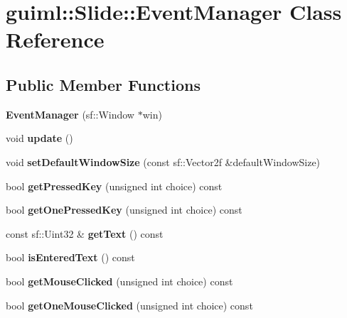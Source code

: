 \section{guiml\-:\-:Slide\-:\-:Event\-Manager Class Reference}
\label{classguiml_1_1_slide_1_1_event_manager}
\subsection*{Public Member Functions}
\begin{DoxyCompactItemize}
\item 
{\bfseries Event\-Manager} (sf\-::\-Window $\ast$win)\label{classguiml_1_1_slide_1_1_event_manager_a2312e0afea0595bfe5313506417b1020}

\item 
void {\bfseries update} ()\label{classguiml_1_1_slide_1_1_event_manager_a26ff440020a0bf66759d27147cdc0910}

\item 
void {\bfseries set\-Default\-Window\-Size} (const sf\-::\-Vector2f \&default\-Window\-Size)\label{classguiml_1_1_slide_1_1_event_manager_a36ce2699e385199a00e9ae84fb98f3af}

\item 
bool {\bfseries get\-Pressed\-Key} (unsigned int choice) const \label{classguiml_1_1_slide_1_1_event_manager_ab3c83fb89eba4f54a716ef9e1ed88a50}

\item 
bool {\bfseries get\-One\-Pressed\-Key} (unsigned int choice) const \label{classguiml_1_1_slide_1_1_event_manager_a0af69bffc6dfb52568b0737d1b29e41f}

\item 
const sf\-::\-Uint32 \& {\bfseries get\-Text} () const \label{classguiml_1_1_slide_1_1_event_manager_a7a8fde225b3f218509023f19cf7d44be}

\item 
bool {\bfseries is\-Entered\-Text} () const \label{classguiml_1_1_slide_1_1_event_manager_a9f140592c6c835cf31dd7ba3e9335d5d}

\item 
bool {\bfseries get\-Mouse\-Clicked} (unsigned int choice) const \label{classguiml_1_1_slide_1_1_event_manager_a6e674b83521874b06f1a15bcff739c8b}

\item 
bool {\bfseries get\-One\-Mouse\-Clicked} (unsigned int choice) const \label{classguiml_1_1_slide_1_1_event_manager_a9393aa32b4870260d56bcea81c649f27}


\end{DoxyCompactItemize}
